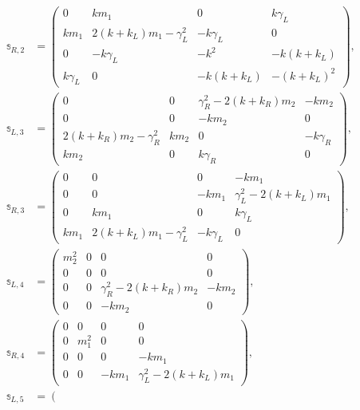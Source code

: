 \begin{align}
    \mathbb{s}_{R,2} & = \left(
    \begin{array}{cccc}
      0 & k m_1 & 0 & k \gamma_L \\
      k m_1 & 2 (k+k_L) m_1-\gamma_L^2 & -k \gamma_L & 0 \\
      0 & -k \gamma_L & -k^2 & -k (k+k_L) \\
      k \gamma_L & 0 & -k (k+k_L) & -(k+k_L)^2
    \end{array}
    \right),
    \nonumber\\
    \mathbb{s}_{L,3} &= \left(
    \begin{array}{cccc}
      0 & 0 & \gamma_R^2-2 (k+k_R) m_2 & -k m_2 \\
      0 & 0 & -k m_2 & 0 \\
      2 (k+k_R) m_2-\gamma_R^2 & k m_2 & 0 & -k \gamma_R \\
      k m_2 & 0 & k \gamma_R & 0
    \end{array}
    \right),
    \nonumber\\
    \mathbb{s}_{R,3} & =\left(
    \begin{array}{cccc}
      0 & 0 & 0 & -k m_1 \\
      0 & 0 & -k m_1 & \gamma_L^2-2 (k+k_L) m_1 \\
      0 & k m_1 & 0 & k \gamma_L \\
      k m_1 & 2 (k+k_L) m_1-\gamma_L^2 & -k \gamma_L & 0
    \end{array}
    \right),
    \nonumber\\
    \mathbb{s}_{L,4} &= \left(
    \begin{array}{cccc}
      m_2^2 & 0 & 0 & 0 \\
      0 & 0 & 0 & 0 \\
      0 & 0 & \gamma_R^2-2 (k+k_R) m_2 & -k m_2 \\
      0 & 0 & -k m_2 & 0
    \end{array}
    \right),
    \nonumber\\
    \mathbb{s}_{R,4} & = \left(
    \begin{array}{cccc}
      0 & 0 & 0 & 0 \\
      0 & m_1^2 & 0 & 0 \\
      0 & 0 & 0 & -k m_1 \\
      0 & 0 & -k m_1 & \gamma_L^2-2 (k+k_L) m_1
    \end{array}
    \right),
    \nonumber\\
    \mathbb{s}_{L,5} &= \left(
    \begin{array}{cccc}

\end{array}
\end{align}
